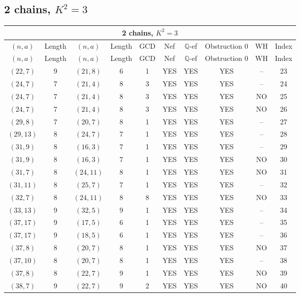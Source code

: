 \subsection{2 chains, \(K^2 = 3\)}
\begin{longtable}{|c|c|c|c|c|c|c|c|c|c|}
\hline
\multicolumn{10}{|c|}{2 chains, $K^2 = 3$}\\
\hline
$(n,a)$ & Length & $(n,a)$ & Length & GCD & Nef & $\mathbb Q$-ef & Obstruction 0 & WH & Index\\
\hline
\endfirsthead

\hline
$(n,a)$ & Length & $(n,a)$ & Length & GCD & Nef & $\mathbb Q$-ef & Obstruction 0 & WH & Index\\
\hline
\endhead
\hline
\endfoot

$(22, 7)$ & 9 & $(21, 8)$ & 6 & 1 & YES & YES & YES & -- & 23\\
$(24, 7)$ & 7 & $(21, 4)$ & 8 & 3 & YES & YES & YES & -- & 24\\
$(24, 7)$ & 7 & $(21, 4)$ & 8 & 3 & YES & YES & YES & NO & 25\\
$(24, 7)$ & 7 & $(21, 4)$ & 8 & 3 & YES & YES & YES & NO & 26\\
$(29, 8)$ & 7 & $(20, 7)$ & 8 & 1 & YES & YES & YES & -- & 27\\
$(29, 13)$ & 8 & $(24, 7)$ & 7 & 1 & YES & YES & YES & -- & 28\\
$(31, 9)$ & 8 & $(16, 3)$ & 7 & 1 & YES & YES & YES & -- & 29\\
$(31, 9)$ & 8 & $(16, 3)$ & 7 & 1 & YES & YES & YES & NO & 30\\
$(31, 7)$ & 8 & $(24, 11)$ & 8 & 1 & YES & YES & YES & NO & 31\\
$(31, 11)$ & 8 & $(25, 7)$ & 7 & 1 & YES & YES & YES & -- & 32\\
$(32, 7)$ & 8 & $(24, 11)$ & 8 & 8 & YES & YES & YES & NO & 33\\
$(33, 13)$ & 9 & $(32, 5)$ & 9 & 1 & YES & YES & YES & -- & 34\\
$(37, 17)$ & 9 & $(17, 5)$ & 6 & 1 & YES & YES & YES & -- & 35\\
$(37, 17)$ & 9 & $(18, 5)$ & 6 & 1 & YES & YES & YES & -- & 36\\
$(37, 8)$ & 8 & $(20, 7)$ & 8 & 1 & YES & YES & YES & NO & 37\\
$(37, 10)$ & 8 & $(20, 7)$ & 8 & 1 & YES & YES & YES & -- & 38\\
$(37, 8)$ & 8 & $(22, 7)$ & 9 & 1 & YES & YES & YES & NO & 39\\
$(38, 7)$ & 9 & $(22, 7)$ & 9 & 2 & YES & YES & YES & NO & 40\\

\end{longtable}
